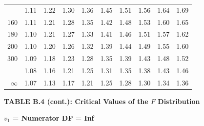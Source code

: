 \documentclass[10pt]{article}
\begin{document}
\begin{longtable}{@{}r!{\vrule width 0.8pt\hspace{0.55em}}rrrrrrrrr@{}}
 & 1.11 & 1.22 & 1.30 & 1.36 & 1.45 & 1.51 & 1.56 & 1.64 & 1.69 \\
160 & 1.11 & 1.21 & 1.28 & 1.35 & 1.42 & 1.48 & 1.53 & 1.60 & 1.65 \\
180 & 1.10 & 1.21 & 1.27 & 1.33 & 1.41 & 1.46 & 1.51 & 1.57 & 1.62 \\
200 & 1.10 & 1.20 & 1.26 & 1.32 & 1.39 & 1.44 & 1.49 & 1.55 & 1.60 \\
300 & 1.09 & 1.18 & 1.23 & 1.28 & 1.35 & 1.39 & 1.43 & 1.48 & 1.52 \\
 & 1.08 & 1.16 & 1.21 & 1.25 & 1.31 & 1.35 & 1.38 & 1.43 & 1.46 \\
$\infty$ & 1.07 & 1.13 & 1.17 & 1.21 & 1.25 & 1.28 & 1.30 & 1.34 & 1.36 \\
\end{longtable}
\newpage
\thispagestyle{empty}
\begin{center}
{\large\bfseries TABLE B.4 (cont.): Critical Values of the $F$ Distribution\par}
\end{center}
{\large\bfseries $v_1$ = Numerator DF = Inf\par}
\vspace{0.5em}
\small
\end{document}
